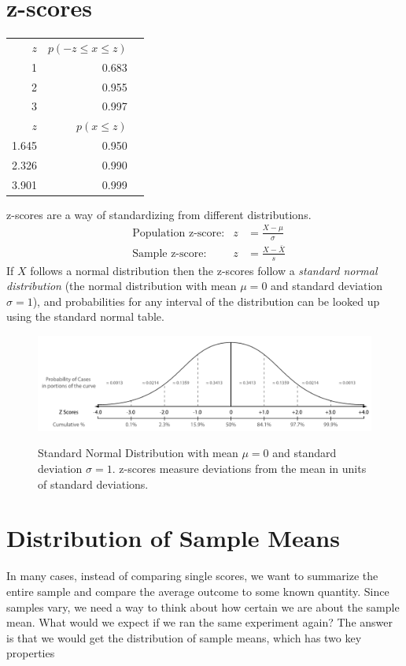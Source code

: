 \documentclass{tufte-handout}
\begin{document}
\section{z-scores}
\begin{margintable}[80pt]
  \centering
  \selectfont
  \begin{tabular}{rrr}
    \toprule
    $z$ & $p(-z \leq x\leq z)$ &\\
     1  &   0.683\\
     2 &   0.955\\
     3 &   0.997\\
    \midrule
    $z$ & $p(x\leq z)$ &\\
     1.645  &   0.950\\
     2.326 &   0.990\\
     3.901 &   0.999\\
    \bottomrule
  \end{tabular}
  \label{tab:normaltab}
\end{margintable}
z-scores are a way of standardizing from different distributions.
\begin{align*}
&\text{Population z-score:} & z&=\frac{X-\mu}{\sigma}\\
&\text{Sample z-score:} & z&=\frac{X-\bar{X}}{s}
\end{align*}
If $X$ follows a normal distribution then the z-scores follow a \emph{standard normal distribution} (the normal distribution with mean $\mu=0$ and standard deviation $\sigma=1$), and probabilities for any interval of the distribution can be looked up using the standard normal table.
\begin{figure}[h]
  \includegraphics[width=\linewidth]{images/handout2_standard_normal}%
  \label{fig:fullfig}%
  \caption{Standard Normal Distribution with mean $\mu=0$ and standard deviation $\sigma=1$. z-scores measure deviations from the mean in units of standard deviations.}
\end{figure}

\pagebreak

\section{Distribution of Sample Means}
In many cases, instead of comparing single scores, we want to summarize the entire sample and compare the average outcome to some known quantity. Since samples vary, we need a way to think about how certain we are about the sample mean. What would we expect if we ran the same experiment again? The answer is that we would get the distribution of sample means, which has two key properties
\end{document}
